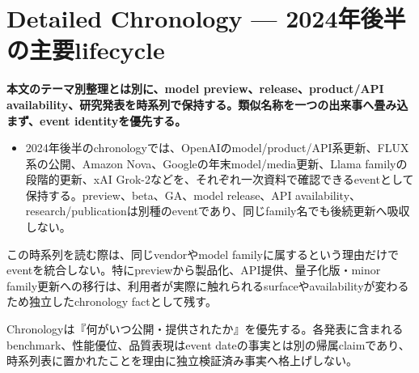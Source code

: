 \section{Detailed Chronology — 2024年後半の主要lifecycle}
\noindent\textbf{本文のテーマ別整理とは別に、model preview、release、product/API availability、研究発表を時系列で保持する。類似名称を一つの出来事へ畳み込まず、event identityを優先する。}\autocite{src-10b59b402b80,src-c3a08c57269d}

\begin{itemize}
  \item 2024年後半のchronologyでは、OpenAIのmodel/product/API系更新、FLUX系の公開、Amazon Nova、Googleの年末model/media更新、Llama familyの段階的更新、xAI Grok-2などを、それぞれ一次資料で確認できるeventとして保持する。preview、beta、GA、model release、API availability、research/publicationは別種のeventであり、同じfamily名でも後続更新へ吸収しない。
\end{itemize}
\autocite{src-10b59b402b80,src-1572648d0de9,src-5db07766b472,src-6bbe9721db06,src-99e6401ec31b,src-bc9a95ff1e00,src-c3a08c57269d,src-e92e95daf8e0}

この時系列を読む際は、同じvendorやmodel familyに属するという理由だけでeventを統合しない。特にpreviewから製品化、API提供、量子化版・minor family更新への移行は、利用者が実際に触れられるsurfaceやavailabilityが変わるため独立したchronology factとして残す。\autocite{src-10b59b402b80,src-6bbe9721db06}


\begin{claimboundary}
Chronologyは『何がいつ公開・提供されたか』を優先する。各発表に含まれるbenchmark、性能優位、品質表現はevent dateの事実とは別の帰属claimであり、時系列表に置かれたことを理由に独立検証済み事実へ格上げしない。\autocite{src-bc9a95ff1e00}
\end{claimboundary}
